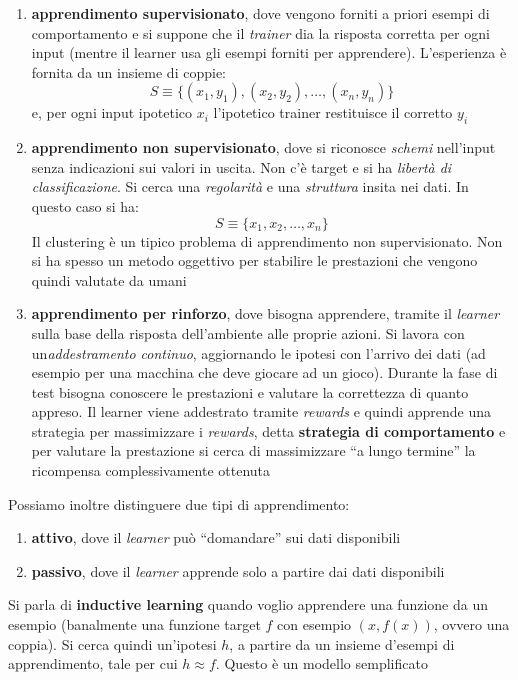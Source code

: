 \documentclass[a4paper,12pt, oneside]{book}
\begin{document}
\begin{enumerate}
  \item \textbf{apprendimento supervisionato}, dove vengono forniti a priori
  esempi di comportamento e si suppone che il \textit{trainer} dia la risposta
  corretta per ogni input (mentre il learner usa gli esempi forniti per
  apprendere). L'esperienza è fornita da un insieme di coppie:
  \[S\equiv\{(x_1,y_1),(x_2,y_2),\ldots,(x_n,y_n)\}\]
  e, per ogni input ipotetico $x_i$ l'ipotetico trainer restituisce il corretto
  $y_i$
  \item \textbf{apprendimento non supervisionato}, dove si riconosce
  \textit{schemi} nell'input senza indicazioni sui valori in uscita. Non c'è
  target e si ha \textit{libertà di classificazione}. Si cerca una
  \textit{regolarità} e una \textit{struttura} insita nei dati. In questo caso
  si ha: 
  \[S\equiv\{x_1,x_2,\ldots,x_n\}\]
  Il clustering è un tipico problema di apprendimento non supervisionato. Non si
  ha spesso un metodo oggettivo per stabilire le prestazioni che vengono quindi
  valutate da umani
  \item \textbf{apprendimento per rinforzo}, dove bisogna apprendere, tramite il
  \textit{learner} sulla base
  della risposta dell’ambiente alle proprie azioni. Si lavora con
  un\textit{addestramento continuo}, aggiornando le ipotesi con l'arrivo dei
  dati (ad esempio per una macchina che deve giocare ad un gioco). Durante la
  fase di test bisogna conoscere le prestazioni e valutare la correttezza di
  quanto appreso. Il learner viene addestrato tramite \textit{rewards} e quindi
  apprende una strategia per massimizzare i \textit{rewards}, detta
  \textbf{strategia di comportamento} e per valutare la prestazione si cerca di
  massimizzare ``a lungo termine'' la ricompensa complessivamente ottenuta
\end{enumerate}
Possiamo inoltre distinguere due tipi di apprendimento:
\begin{enumerate}
  \item \textbf{attivo}, dove il \textit{learner} può ``domandare'' sui dati
  disponibili 
  \item \textbf{passivo}, dove il \textit{learner} apprende solo a partire dai
  dati disponibili 
\end{enumerate}
Si parla di \textbf{inductive learning} quando voglio apprendere una funzione da
un esempio (banalmente una funzione target $f$ con esempio $(x, f(x))$, ovvero
una coppia). Si cerca quindi un'ipotesi $h$, a partire da un insieme d'esempi di
apprendimento, tale per cui $h\approx f$. Questo è un modello semplificato
\end{document}
